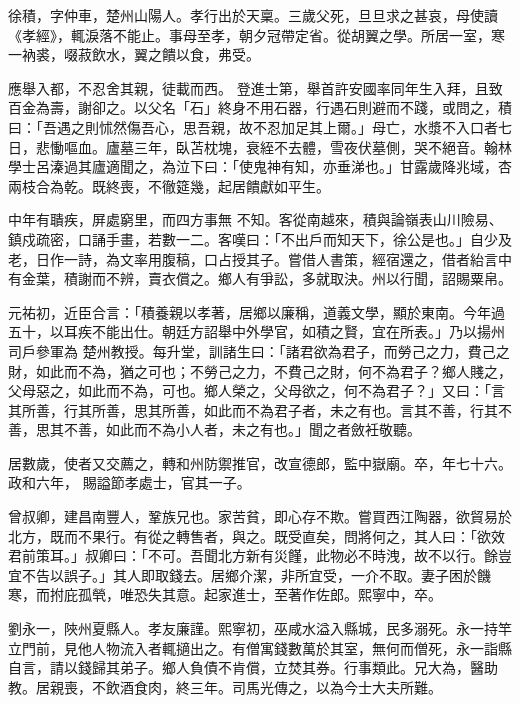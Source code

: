 \begin{pinyinscope}
 徐積，字仲車，楚州山陽人。孝行出於天稟。三歲父死，旦旦求之甚哀，母使讀《孝經》，輒淚落不能止。事母至孝，朝夕冠帶定省。從胡翼之學。所居一室，寒一衲裘，啜菽飲水，翼之饋以食，弗受。



 應舉入都，不忍舍其親，徒載而西。
 登進士第，舉首許安國率同年生入拜，且致百金為壽，謝卻之。以父名「石」終身不用石器，行遇石則避而不踐，或問之，積曰：「吾遇之則怵然傷吾心，思吾親，故不忍加足其上爾。」母亡，水漿不入口者七日，悲慟嘔血。廬墓三年，臥苫枕塊，衰絰不去體，雪夜伏墓側，哭不絕音。翰林學士呂溱過其廬適聞之，為泣下曰：「使鬼神有知，亦垂涕也。」甘露歲降兆域，杏兩枝合為乾。既終喪，不徹筵幾，起居饋獻如平生。



 中年有聵疾，屏處窮里，而四方事無
 不知。客從南越來，積與論嶺表山川險易、鎮戍疏密，口誦手畫，若數一二。客嘆曰：「不出戶而知天下，徐公是也。」自少及老，日作一詩，為文率用腹稿，口占授其子。嘗借人書策，經宿還之，借者紿言中有金葉，積謝而不辨，賣衣償之。鄉人有爭訟，多就取決。州以行聞，詔賜粟帛。



 元祐初，近臣合言：「積養親以孝著，居鄉以廉稱，道義文學，顯於東南。今年過五十，以耳疾不能出仕。朝廷方詔舉中外學官，如積之賢，宜在所表。」乃以揚州司戶參軍為
 楚州教授。每升堂，訓諸生曰：「諸君欲為君子，而勞己之力，費己之財，如此而不為，猶之可也；不勞己之力，不費己之財，何不為君子？鄉人賤之，父母惡之，如此而不為，可也。鄉人榮之，父母欲之，何不為君子？」又曰：「言其所善，行其所善，思其所善，如此而不為君子者，未之有也。言其不善，行其不善，思其不善，如此而不為小人者，未之有也。」聞之者斂衽敬聽。



 居數歲，使者又交薦之，轉和州防禦推官，改宣德郎，監中嶽廟。卒，年七十六。政和六年，
 賜謚節孝處士，官其一子。



 曾叔卿，建昌南豐人，鞏族兄也。家苦貧，即心存不欺。嘗買西江陶器，欲貿易於北方，既而不果行。有從之轉售者，與之。既受直矣，問將何之，其人曰：「欲效君前策耳。」叔卿曰：「不可。吾聞北方新有災饉，此物必不時洩，故不以行。餘豈宜不告以誤子。」其人即取錢去。居鄉介潔，非所宜受，一介不取。妻子困於饑寒，而拊庇孤煢，唯恐失其意。起家進士，至著作佐郎。熙寧中，卒。



 劉永一，陜州夏縣人。孝友廉謹。熙寧初，巫咸水溢入縣城，民多溺死。永一持竿立門前，見他人物流入者輒擿出之。有僧寓錢數萬於其室，無何而僧死，永一詣縣自言，請以錢歸其弟子。鄉人負債不肯償，立焚其券。行事類此。兄大為，醫助教。居親喪，不飲酒食肉，終三年。司馬光傳之，以為今士大夫所難。



\end{pinyinscope}